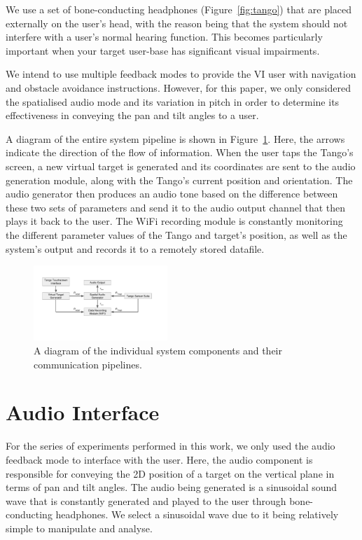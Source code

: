 \documentclass[format=sigconf, review=true, screen=true, anonymous=true]{acmart}
\begin{document}
We use a set of bone-conducting headphones (Figure~\ref{fig:tango}) that are placed externally on the user's head, with the reason being that the system should not interfere with a user's normal hearing function. This becomes particularly important when your target user-base has significant visual impairments. 

We intend to use multiple feedback modes to provide the VI user with navigation and obstacle avoidance instructions. However, for this paper, we only considered the spatialised audio mode and its variation in pitch in order to determine its effectiveness in conveying the pan and tilt angles to a user.

A diagram of the entire system pipeline is shown in Figure~\ref{fig:pipeline}. Here, the arrows indicate the direction of the flow of information. When the user taps the Tango's screen, a new virtual target is generated and its coordinates are sent to the audio generation module, along with the Tango's current position and orientation. The audio generator then produces an audio tone based on the difference between these two sets of parameters and send it to the audio output channel that then plays it back to the user. The WiFi recording module is constantly monitoring the different parameter values of the Tango and target's position, as well as the system's output and records it to a remotely stored datafile. 

\begin{figure}
  \centering
  \includegraphics[width=0.45\textwidth]{figures/pipeline.pdf}
  \caption{A diagram of the individual system components and their communication pipelines. }
  \label{fig:pipeline}
\end{figure}

\section{Audio Interface}
\label{sec:interface}

For the series of experiments performed in this work, we only used the audio feedback mode to interface with the user. Here, the audio component is responsible for conveying the 2D position of a target on the vertical plane in terms of pan and tilt angles. 
The audio being generated is a sinusoidal sound wave that is constantly generated and played to the user through bone-conducting headphones. We select a sinusoidal wave due to it being relatively simple to manipulate and analyse. %
\end{document}

